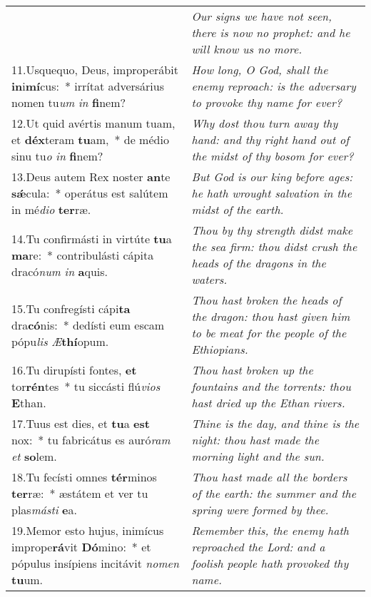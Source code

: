 \begin{longtable}{@{\hskip0pt} p{10cm} | p{6cm} @{\hskip0pt}}
 & \textit{\small Our signs we have not seen, there is now no prophet: and he will know us no more.
}\\
11.\enspace Usquequo, Deus, improperábit \textbf{in}i\textbf{mí}cus:~* irrítat adversárius nomen tu\textit{um} \textit{in} \textbf{fi}nem?
 & \textit{\small How long, O God, shall the enemy reproach: is the adversary to provoke thy name for ever?
}\\
12.\enspace Ut quid avértis manum tuam, et \textbf{déx}teram \textbf{tu}am,~* de médio sinu tu\textit{o} \textit{in} \textbf{fi}nem?
 & \textit{\small Why dost thou turn away thy hand: and thy right hand out of the midst of thy bosom for ever?
}\\
13.\enspace Deus autem Rex noster \textbf{an}te \textbf{s\'{\ae}}cula:~* operátus est salútem in mé\textit{di}\textit{o} \textbf{ter}ræ.
 & \textit{\small But God is our king before ages: he hath wrought salvation in the midst of the earth.
}\\
14.\enspace Tu confirmásti in virtúte \textbf{tu}a \textbf{ma}re:~* contribulásti cápita dracó\textit{num} \textit{in} \textbf{a}quis.
 & \textit{\small Thou by thy strength didst make the sea firm: thou didst crush the heads of the dragons in the waters.
}\\
15.\enspace Tu confregísti cápi\textbf{ta} dra\textbf{có}nis:~* dedísti eum escam pópu\textit{lis} \textit{Æ}\textbf{thí}opum.
 & \textit{\small Thou hast broken the heads of the dragon: thou hast given him to be meat for the people of the Ethiopians.
}\\
16.\enspace Tu dirupísti fontes, \textbf{et} tor\textbf{rén}tes~* tu siccásti flú\textit{vi}\textit{os} \textbf{E}than.
 & \textit{\small Thou hast broken up the fountains and the torrents: thou hast dried up the Ethan rivers.
}\\
17.\enspace Tuus est dies, et \textbf{tu}a \textbf{est} nox:~* tu fabricátus es auró\textit{ram} \textit{et} \textbf{so}lem.
 & \textit{\small Thine is the day, and thine is the night: thou hast made the morning light and the sun.
}\\
18.\enspace Tu fecísti omnes \textbf{tér}minos \textbf{ter}ræ:~* æstátem et ver tu plas\textit{más}\textit{ti} \textbf{e}a.
 & \textit{\small Thou hast made all the borders of the earth: the summer and the spring were formed by thee.
}\\
19.\enspace Memor esto hujus, inimícus imprope\textbf{rá}vit \textbf{Dó}mino:~* et pópulus insípiens incitávit \textit{no}\textit{men} \textbf{tu}um.
 & \textit{\small Remember this, the enemy hath reproached the Lord: and a foolish people hath provoked thy name.
}
\end{longtable}
